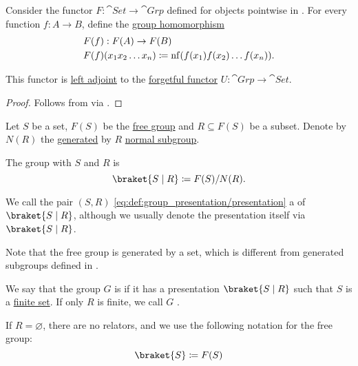 \begin{corollary}\label{thm:free_group_functor}
  Consider the functor \( F: \cat{Set} \to \cat{Grp} \) defined for objects pointwise in . For every function \( f: A \to B \), define the \hyperref[def:group/homomorphism]{group homomorphism}
  \begin{equation*}
    \begin{aligned}
      &F(f): F(A) \to F(B) \\
      &F(f)(x_1 x_2 \ldots x_n) \coloneqq \operatorname{nf}(f(x_1) f(x_2) \ldots f(x_n)).
    \end{aligned}
  \end{equation*}

  This functor is \hyperref[def:category_adjunction]{left adjoint} to the \hyperref[def:concrete_category]{forgetful functor} \( U: \cat{Grp} \to \cat{Set} \).
\end{corollary}
\begin{proof}
  Follows from  via .
\end{proof}

\begin{definition}\label{def:group_presentation}
  Let \( S \) be a set, \( F(S) \) be the \hyperref[def:free_group]{free group} and \( R \subseteq F(S) \) be a subset. Denote by \( N(R) \) the \hyperref[def:first_order_generated_substructure]{generated} by \( R \) \hyperref[def:normal_subgroup]{normal subgroup}.

  The group with  \( S \) and  \( R \) is
  \begin{equation}\label{eq:def:group_presentation/presentation}
    \braket{ S \mid R } \coloneqq F(S) / N(R).
  \end{equation}

  We call the pair \( (S, R) \) \eqref{eq:def:group_presentation/presentation} a  of \( \braket{ S \mid R } \), although we usually denote the presentation itself via \( \braket{ S \mid R } \).

  Note that the free group is generated by a set, which is different from generated subgroups defined in .

  We say that the group \( G \) is  if it has a presentation \( \braket{ S \mid R } \) such that \( S \) is a \hyperref[def:set_finiteness]{finite set}. If only \( R \) is finite, we call \( G \) .

  If \( R = \varnothing \), there are no relators, and we use the following notation for the free group:
  \begin{equation}\label{eq:def:group_presentation/free}
    \braket{ S } \coloneqq F(S)
  \end{equation}
\end{definition}

